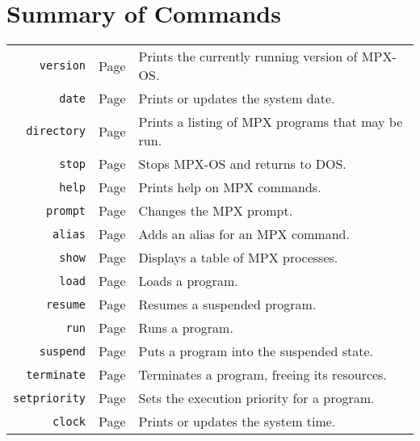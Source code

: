 \chapter{Summary of Commands}
\label{summary_of_commands}

\begin{tabular}{r c l}
    {\tt version}     & Page \pageref{version_cmd}     & Prints the currently running version of MPX-OS. \\
    {\tt date}        & Page \pageref{date_cmd}        & Prints or updates the system date. \\
    {\tt directory}   & Page \pageref{directory_cmd}   & Prints a listing of MPX programs that may be run. \\
    {\tt stop}        & Page \pageref{stop_cmd}        & Stops MPX-OS and returns to DOS. \\
    {\tt help}        & Page \pageref{help_cmd}        & Prints help on MPX commands. \\
    {\tt prompt}      & Page \pageref{prompt_cmd}      & Changes the MPX prompt. \\
    {\tt alias}       & Page \pageref{alias_cmd}       & Adds an alias for an MPX command. \\
    {\tt show}        & Page \pageref{show_cmd}        & Displays a table of MPX processes. \\
    {\tt load}        & Page \pageref{load_cmd}        & Loads a program. \\
    {\tt resume}      & Page \pageref{resume_cmd}      & Resumes a suspended program. \\
    {\tt run}         & Page \pageref{run_cmd}         & Runs a program. \\
    {\tt suspend}     & Page \pageref{suspend_cmd}     & Puts a program into the suspended state. \\
    {\tt terminate}   & Page \pageref{terminate_cmd}   & Terminates a program, freeing its resources. \\
    {\tt setpriority} & Page \pageref{setpriority_cmd} & Sets the execution priority for a program. \\
    {\tt clock}       & Page \pageref{clock_cmd}       & Prints or updates the system time. \\
\end{tabular}
